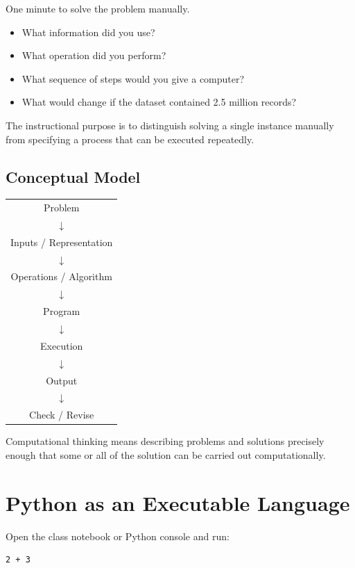 \documentclass[11pt]{article}
\begin{document}
One minute to solve the problem manually.

\begin{itemize}
    \item What information did you use?
    \item What operation did you perform?
    \item What sequence of steps would you give a computer?
    \item What would change if the dataset contained 2.5 million records?
\end{itemize}

The instructional purpose is to distinguish solving a single instance manually from specifying a process that can be executed repeatedly.

\subsection*{Conceptual Model}

\begin{center}
\begin{tabular}{c}
Problem \\
$\downarrow$ \\
Inputs / Representation \\
$\downarrow$ \\
Operations / Algorithm \\
$\downarrow$ \\
Program \\
$\downarrow$ \\
Execution \\
$\downarrow$ \\
Output \\
$\downarrow$ \\
Check / Revise
\end{tabular}
\end{center}

Computational thinking means describing problems and solutions precisely enough that some or all of the solution can be carried out computationally.

\section{Python as an Executable Language}

Open the class notebook or Python console and run:

\begin{lstlisting}
2 + 3
\end{lstlisting}
\end{document}
